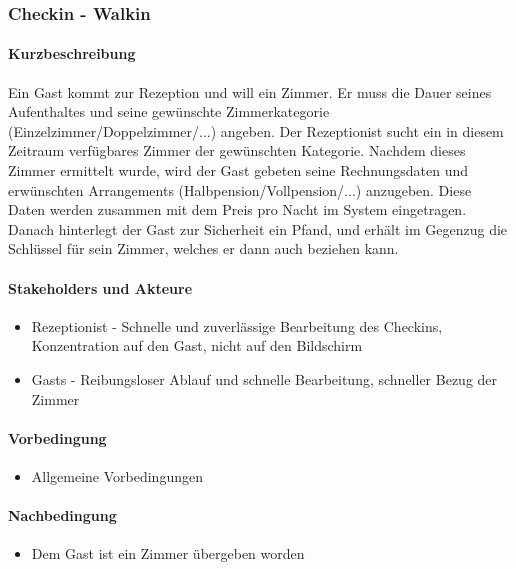 \subsubsection{Checkin - Walkin}
\label{UseCase_CheckinWalkin}

\paragraph{Kurzbeschreibung}
Ein \Gls{Gast} kommt zur \Gls{Rezeption} und will ein \Gls{Zimmer}. Er muss die Dauer seines Aufenthaltes und seine gewünschte Zimmerkategorie (Einzelzimmer/Doppelzimmer/...) angeben. Der \Gls{Rezeptionist} sucht ein in diesem Zeitraum verfügbares \Gls{Zimmer} der gewünschten Kategorie. Nachdem dieses \Gls{Zimmer} ermittelt wurde, wird der \Gls{Gast} gebeten seine Rechnungsdaten und erwünschten \Gls{Arrangement}s (Halbpension/Vollpension/...) anzugeben. Diese Daten werden zusammen mit dem Preis pro Nacht im System eingetragen. Danach hinterlegt der \Gls{Gast} zur Sicherheit ein Pfand, und erhält im Gegenzug die Schlüssel für sein \Gls{Zimmer}, welches er dann auch beziehen kann.

\paragraph{Stakeholders und Akteure}
\begin{itemize}
	\item \Gls{Rezeptionist} - Schnelle und zuverlässige Bearbeitung des
	\Gls{Checkin}s, Konzentration auf den  \Gls{Gast}, nicht auf den Bildschirm
	\item \Glspl{Gast} - Reibungsloser Ablauf und schnelle Bearbeitung, schneller Bezug der \Gls{Zimmer}
\end{itemize}

\paragraph{Vorbedingung}
\begin{itemize}
	\item Allgemeine Vorbedingungen
\end{itemize}

\paragraph{Nachbedingung}
\begin{itemize}
	\item Dem Gast ist ein Zimmer übergeben worden
\end{itemize}

